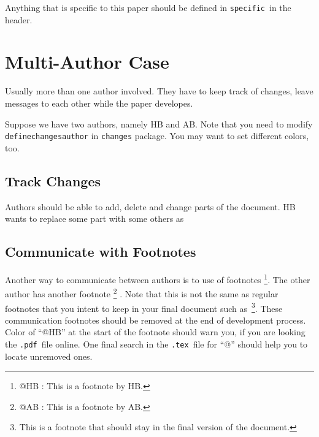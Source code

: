 \documentclass[pre,twocolumn,showkeys,longbibliography]{revtex4-1}
\makeatletter
\newcommand{\hbCode}[1]{\texttt{#1}}
\newcommand{\hbFootnote}[2]{\footnote{{\color{red} @#1 : }#2}}
\theoremstyle{plain}%
\theoremstyle{definition}
\theoremstyle{remark}
\newcommand{\hbDTex}{\hbCode{.tex}}
\newcommand{\hbDPdf}{\hbCode{.pdf}}
\newcommand{\hbSSpecific}{\hbCode{specific}}
\makeatother
\begin{document}
Anything that is specific to this paper should be defined in \hbSSpecific\ in the header.




\section{Multi-Author Case}

Usually more than one author involved.
They have to keep track of changes, leave messages to each other
while the paper developes.

Suppose we have two authors, namely HB and AB.
Note that you need to modify 
\hbCode{definechangesauthor}
in 
\hbCode{changes} package.
You may want to set different colors, too.



\subsection{Track Changes}

Authors should be able to add, delete and change parts of the document.
HB wants to replace some part with some others as




\subsection{Communicate with Footnotes}

Another way to communicate between authors is to use of footnotes
\hbFootnote{HB}{
	This is a footnote by HB.
}.
The other author has another footnote
\hbFootnote{AB}{
	This is a footnote by AB.
}
.
Note that this is not the same as regular footnotes that you intent to keep in your final document such as~\footnote{
	This is a footnote that should stay in the final version of the document.
}.
These communication footnotes should be removed at the end of development process.
Color of ``@HB'' at the start of the footnote should warn you, if you are looking the \hbDPdf\ file online.
One final search in the \hbDTex\ file for ``@'' should help you to locate unremoved ones.






\end{document}
